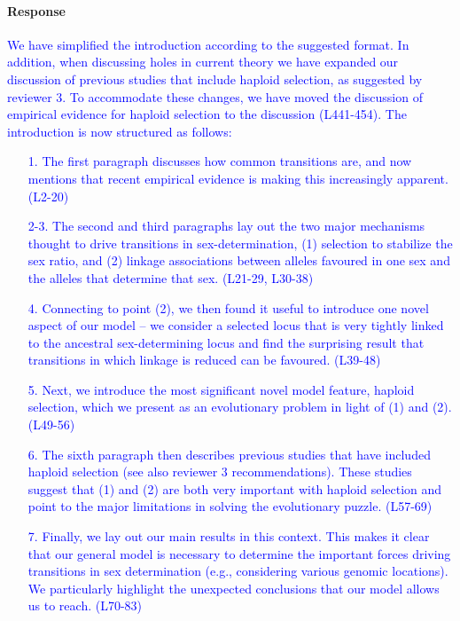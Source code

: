 \documentclass[10pt,letterpaper]{article}
\begin{document}
\noindent\paragraph{Response}
\textcolor{blue}{
We have simplified the introduction according to the suggested format. In addition, when discussing holes in current theory we have expanded our discussion of previous studies that include haploid selection, as suggested by reviewer 3. 
To accommodate these changes, we have moved the discussion of empirical evidence for haploid selection to the discussion (L441-454). The introduction is now structured as follows:
\begin{enumerate}
\item[1.]{The first paragraph discusses how common transitions are, and now mentions that recent empirical evidence is making this increasingly apparent. (L2-20)}
\item[2-3.]{The second and third paragraphs lay out the two major mechanisms thought to drive transitions in sex-determination, (1) selection to stabilize the sex ratio, and (2) linkage associations between alleles favoured in one sex and the alleles that determine that sex. (L21-29, L30-38) }
\item[4.]{Connecting to point (2), we then found it useful to introduce one novel aspect of our model -- we consider a selected locus that is very tightly linked to the ancestral sex-determining locus and find the surprising result that transitions in which linkage is reduced can be favoured. (L39-48)}
\item[5.]{Next, we introduce the most significant novel model feature, haploid selection, which we present as an evolutionary problem in light of (1) and (2). (L49-56) }
\item[6.]{The sixth paragraph then describes previous studies that have included haploid selection (see also reviewer 3 recommendations). These studies suggest that (1) and (2) are both very important with haploid selection and point to the major limitations in solving the evolutionary puzzle. (L57-69)}
\item[7.]{Finally, we lay out our main results in this context. This makes it clear that our general model is necessary to determine the important forces driving transitions in sex determination (e.g., considering various genomic locations). We particularly highlight the unexpected conclusions that our model allows us to reach. (L70-83)}
\end{enumerate}
}
\end{document}

